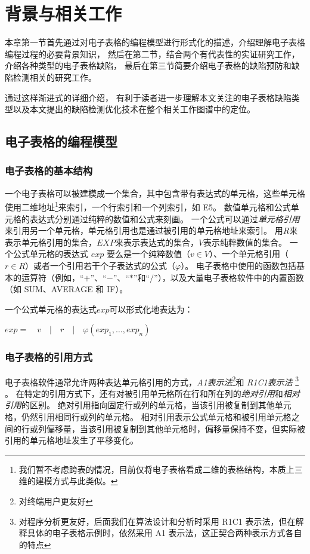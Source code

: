 \chapter{背景与相关工作}
本章第一节首先通过对电子表格的编程模型进行形式化的描述，介绍理解电子表格编程过程的必要背景知识，
然后在第二节，结合两个有代表性的实证研究工作，介绍各种类型的电子表格缺陷，
最后在第三节简要介绍电子表格的缺陷预防和缺陷检测相关的研究工作。

通过这样渐进式的详细介绍，
有利于读者进一步理解本文关注的电子表格缺陷类型以及本文提出的缺陷检测优化技术在整个相关工作图谱中的定位。


\section{电子表格的编程模型}

\subsection{电子表格的基本结构}
一个电子表格可以被建模成一个集合，其中包含带有表达式的单元格，这些单元格使用二维地址\footnote{我们暂不考虑跨表的情况，目前仅将电子表格看成二维的表格结构，本质上三维的建模方式与此类似。}来索引，一个行索引和一个列索引，如 E5。
数值单元格和公式单元格的表达式分别通过纯粹的数值和公式来刻画。
一个公式可以通过\textit{单元格引用}来引用另一个单元格，单元格引用也是通过被引用的单元格地址来索引。
用$R$来表示单元格引用的集合，$EXP$来表示表达式的集合，$V$表示纯粹数值的集合。
一个公式单元格的表达式 $exp$ 要么是一个纯粹数值（$v \in V$）、一个单元格引用（$r \in R$）或者一个引用若干个子表达式的公式（$\varphi $）。
电子表格中使用的函数包括基本的运算符（例如，“$+$”、“$-$”、“$*$”和“$/$”），以及大量电子表格软件中的内置函数（如 SUM、AVERAGE 和 IF）。

一个公式单元格的表达式$exp$可以形式化地表达为：
\begin{definition}
    $ exp =\quad v\quad |\quad r\quad |\quad \varphi (exp_1,\dots,exp_n) $
\end{definition}

\subsection{电子表格的引用方式}
电子表格软件通常允许两种表达单元格引用的方式，\textit{A1表示法}\footnote{对终端用户更友好}和 \textit{R1C1表示法} \footnote{对程序分析更友好，后面我们在算法设计和分析时采用 R1C1 表示法，但在解释具体的电子表格示例时，依然采用 A1 表示法，这正契合两种表示方式各自的特点} \cite{tan2014bug}。
在特定的引用方式下，还有对被引用单元格所在行和所在列的\textit{绝对引用}和\textit{相对引用}的区别。
绝对引用指向固定行或列的单元格，当该引用被复制到其他单元格，仍然引用相同行或列的单元格。
相对引用表示公式单元格和被引用单元格之间的行或列偏移量，当该引用被复制到其他单元格时，偏移量保持不变，但实际被引用的单元格地址发生了平移变化。


